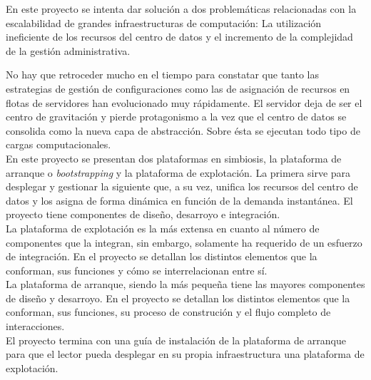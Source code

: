 \documentclass[a4paper,12pt,spanish,final]{epsc_tfc_pfc}
\begin{document}
\pagestyle{empty}
\portada{}


\begin{resum}{1cm}
En este proyecto se intenta dar solución a dos problemáticas relacionadas con la escalabilidad de grandes infraestructuras de computación: La utilización ineficiente de los recursos del centro de datos y el incremento de la complejidad de la gestión administrativa.

No hay que retroceder mucho en el tiempo para constatar que tanto las estrategias de gestión de configuraciones como las de asignación de recursos en flotas de servidores han evolucionado muy rápidamente. El servidor deja de ser el centro de gravitación y pierde protagonismo a la vez que el centro de datos se consolida como la nueva capa de abstracción. Sobre ésta se ejecutan todo tipo de cargas computacionales.\\

En este proyecto se presentan dos plataformas en simbiosis, la plataforma de arranque o \emph{bootstrapping} y la plataforma de explotación. La primera sirve para desplegar y gestionar la siguiente que, a su vez, unifica los recursos del centro de datos y los asigna de forma dinámica en función de la demanda instantánea. El proyecto tiene componentes de diseño, desarroyo e integración.\\

La plataforma de explotación es la más extensa en cuanto al número de componentes que la integran, sin embargo, solamente ha requerido de un esfuerzo de integración. En el proyecto se detallan los distintos elementos que la conforman, sus funciones y cómo se interrelacionan entre sí.\\

La plataforma de arranque, siendo la más pequeña tiene las mayores componentes de diseño y desarroyo. En el proyecto se detallan los distintos elementos que la conforman, sus funciones, su proceso de construción y el flujo completo de interacciones.\\

El proyecto termina con una guía de instalación de la plataforma de arranque para que el lector pueda desplegar en su propia infraestructura una plataforma de explotación.
\end{resum}

\end{document}
